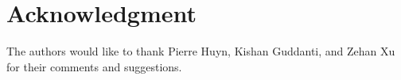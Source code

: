 \documentclass[conference]{IEEEtran}
\begin{document}
%












\section*{Acknowledgment}
The authors would like to thank Pierre Huyn, Kishan Guddanti, and Zehan Xu for their comments and suggestions.

\end{document}
